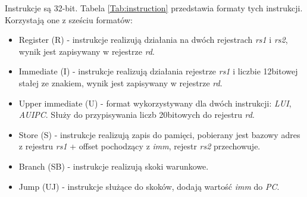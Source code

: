 \documentclass[11pt,a4paper]{article}
\begin{document}
		Instrukcje są 32-bit. Tabela \ref{Tab:instruction} przedstawia formaty tych instrukcji. Korzystają one z sześciu formatów:
		\begin{itemize}
			\item Register (R) - instrukcje realizują działania na dwóch rejestrach {\it rs1} i {\it rs2}, wynik jest zapisywany w rejestrze {\it rd}.
			\item Immediate (I) - instrukcje realizują działania rejestrze {\it rs1} i liczbie 12bitowej stałej ze znakiem, wynik jest zapisywany w rejestrze {\it rd}.
			\item Upper immediate (U) - format wykorzystywany dla dwóch instrukcji: {\it LUI}, {\it AUIPC}. Służy do przypisywania liczb 20bitowych do rejestru {\it rd}.
			\item Store (S) - instrukcje realizują zapis do pamięci, pobierany jest bazowy adres z rejestru {\it rs1} + offset pochodzący z {\it imm}, rejestr {\it rs2} przechowuje.
			\item Branch (SB) - instrukcje realizują skoki warunkowe.
			\item Jump (UJ) - instrukcje służące do skoków, dodają wartość {\it imm} do {\it PC}.
		\end{itemize}
\end{document}
